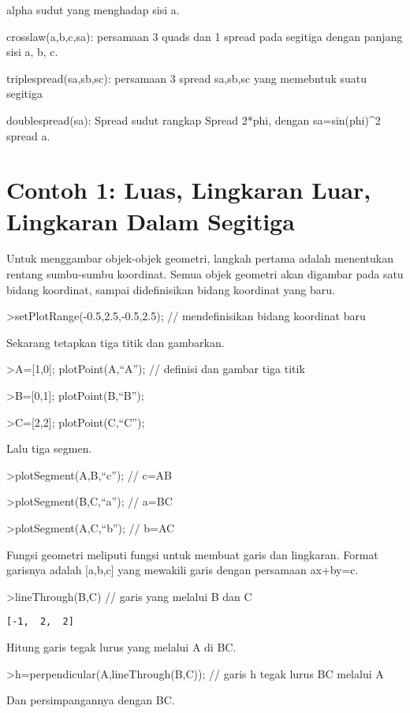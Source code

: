 \documentclass[
]{book}
\begin{document}
alpha sudut yang menghadap sisi a.

crosslaw(a,b,c,sa): persamaan 3 quads dan 1 spread pada segitiga dengan panjang sisi a, b, c.

triplespread(sa,sb,sc): persamaan 3 spread sa,sb,sc yang memebntuk suatu segitiga

doublespread(sa): Spread sudut rangkap Spread 2*phi, dengan sa=sin(phi)\^{}2 spread a.

\section{Contoh 1: Luas, Lingkaran Luar, Lingkaran Dalam Segitiga}\label{contoh-1-luas-lingkaran-luar-lingkaran-dalam-segitiga}

Untuk menggambar objek-objek geometri, langkah pertama adalah menentukan rentang sumbu-sumbu koordinat. Semua objek geometri akan digambar pada satu bidang koordinat, sampai didefinisikan bidang koordinat yang baru.

\textgreater setPlotRange(-0.5,2.5,-0.5,2.5); // mendefinisikan bidang koordinat baru

Sekarang tetapkan tiga titik dan gambarkan.

\textgreater A={[}1,0{]}; plotPoint(A,``A''); // definisi dan gambar tiga titik

\textgreater B={[}0,1{]}; plotPoint(B,``B'');

\textgreater C={[}2,2{]}; plotPoint(C,``C'');

Lalu tiga segmen.

\textgreater plotSegment(A,B,``c''); // c=AB

\textgreater plotSegment(B,C,``a''); // a=BC

\textgreater plotSegment(A,C,``b''); // b=AC

Fungsi geometri meliputi fungsi untuk membuat garis dan lingkaran. Format garisnya adalah {[}a,b,c{]} yang mewakili garis dengan persamaan ax+by=c.

\textgreater lineThrough(B,C) // garis yang melalui B dan C

\begin{verbatim}
[-1,  2,  2]
\end{verbatim}

Hitung garis tegak lurus yang melalui A di BC.

\textgreater h=perpendicular(A,lineThrough(B,C)); // garis h tegak lurus BC melalui A

Dan persimpangannya dengan BC.
\end{document}
